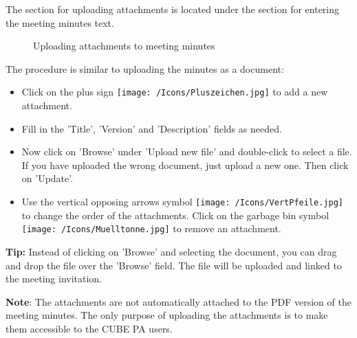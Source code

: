 The section for uploading attachments is located under the section for entering the meeting minutes text.

\begin{figure}[H]
\caption{Uploading attachments to meeting minutes}
\end{figure}

The procedure is similar to uploading the minutes as a document:

\begin{itemize}
\item
Click on the plus sign \texttt{[image: /Icons/Pluszeichen.jpg]}  to add a new attachment.
\item
Fill in the 'Title', 'Version' and 'Description' fields  as needed.
\item
Now click on 'Browse'  under 'Upload new file' and double-click to select a file. If you have uploaded the wrong document, just upload a new one. Then click on 'Update'.
\item
Use the vertical opposing arrows symbol \texttt{[image: /Icons/VertPfeile.jpg]}  to change the order of the attachments. Click on the garbage bin symbol \texttt{[image: /Icons/Muelltonne.jpg]}  to remove an attachment.
\end{itemize}

\vspace{\baselineskip}

\textbf{Tip:} Instead of clicking on 'Browse' and selecting the document, you can drag and drop the file over the 'Browse' field. The file will be uploaded and linked to the meeting invitation.

\vspace{\baselineskip}

\textbf{Note}: The attachments are not automatically attached to the PDF version of the meeting minutes. The only purpose of uploading the attachments is to make them accessible to the CUBE PA users.

